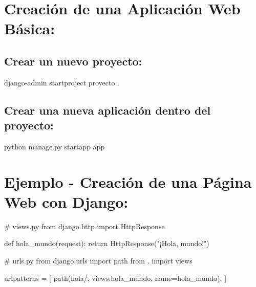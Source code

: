 \documentclass[
  a4paper,
  DIV=11,
  numbers=noendperiod,
  onepage,
  openany]{scrreprt}
\newenvironment{Shaded}{\begin{snugshade}}{\end{snugshade}}
\newcommand{\CommentTok}[1]{\textcolor[rgb]{0.37,0.37,0.37}{#1}}
\newcommand{\ControlFlowTok}[1]{\textcolor[rgb]{0.00,0.23,0.31}{#1}}
\newcommand{\ExtensionTok}[1]{\textcolor[rgb]{0.00,0.23,0.31}{#1}}
\newcommand{\ImportTok}[1]{\textcolor[rgb]{0.00,0.46,0.62}{#1}}
\newcommand{\KeywordTok}[1]{\textcolor[rgb]{0.00,0.23,0.31}{#1}}
\newcommand{\NormalTok}[1]{\textcolor[rgb]{0.00,0.23,0.31}{#1}}
\newcommand{\OperatorTok}[1]{\textcolor[rgb]{0.37,0.37,0.37}{#1}}
\newcommand{\StringTok}[1]{\textcolor[rgb]{0.13,0.47,0.30}{#1}}
\begin{document}
\section{Creación de una Aplicación Web
Básica:}\label{creaciuxf3n-de-una-aplicaciuxf3n-web-buxe1sica}

\subsection{Crear un nuevo proyecto:}\label{crear-un-nuevo-proyecto}

\begin{Shaded}
\begin{Highlighting}[]
\ExtensionTok{django{-}admin}\NormalTok{ startproject proyecto .}
\end{Highlighting}
\end{Shaded}

\subsection{Crear una nueva aplicación dentro del
proyecto:}\label{crear-una-nueva-aplicaciuxf3n-dentro-del-proyecto}

\begin{Shaded}
\begin{Highlighting}[]
\ExtensionTok{python}\NormalTok{ manage.py startapp app}
\end{Highlighting}
\end{Shaded}

\section{Ejemplo - Creación de una Página Web con
Django:}\label{ejemplo---creaciuxf3n-de-una-puxe1gina-web-con-django}

\begin{Shaded}
\begin{Highlighting}[]
\CommentTok{\# views.py}
\ImportTok{from}\NormalTok{ django.http }\ImportTok{import}\NormalTok{ HttpResponse}

\KeywordTok{def}\NormalTok{ hola\_mundo(request):}
    \ControlFlowTok{return}\NormalTok{ HttpResponse(}\StringTok{"¡Hola, mundo!"}\NormalTok{)}
\end{Highlighting}
\end{Shaded}

\begin{Shaded}
\begin{Highlighting}[]
\CommentTok{\# urls.py}
\ImportTok{from}\NormalTok{ django.urls }\ImportTok{import}\NormalTok{ path}
\ImportTok{from}\NormalTok{ . }\ImportTok{import}\NormalTok{ views}

\NormalTok{urlpatterns }\OperatorTok{=}\NormalTok{ [}
\NormalTok{    path(}\StringTok{\textquotesingle{}hola/\textquotesingle{}}\NormalTok{, views.hola\_mundo, name}\OperatorTok{=}\StringTok{\textquotesingle{}hola\_mundo\textquotesingle{}}\NormalTok{),}
\NormalTok{]}
\end{Highlighting}
\end{Shaded}
\end{document}
